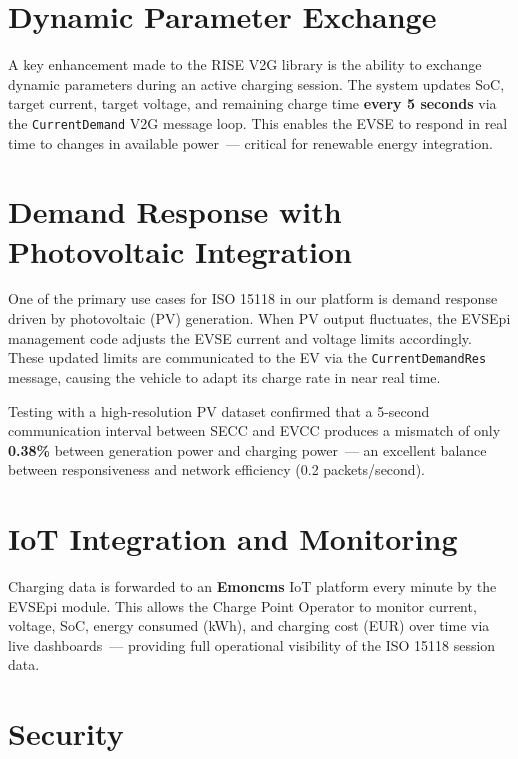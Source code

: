 \documentclass[12pt,a4paper]{report}
\begin{document}
\section{Dynamic Parameter Exchange}

A key enhancement made to the RISE V2G library is the ability to exchange dynamic parameters
during an active charging session. The system updates SoC, target current, target voltage, and
remaining charge time \textbf{every 5 seconds} via the \texttt{CurrentDemand} V2G message loop.
This enables the EVSE to respond in real time to changes in available power~--- critical for
renewable energy integration.

\section{Demand Response with Photovoltaic Integration}

One of the primary use cases for ISO 15118 in our platform is demand response driven by
photovoltaic (PV) generation. When PV output fluctuates, the EVSEpi management code adjusts
the EVSE current and voltage limits accordingly. These updated limits are communicated to the EV
via the \texttt{CurrentDemandRes} message, causing the vehicle to adapt its charge rate in near
real time.

Testing with a high-resolution PV dataset confirmed that a 5-second communication interval
between SECC and EVCC produces a mismatch of only \textbf{0.38\%} between generation power and
charging power~--- an excellent balance between responsiveness and network efficiency
(0.2 packets/second).

\section{IoT Integration and Monitoring}

Charging data is forwarded to an \textbf{Emoncms} IoT platform every minute by the EVSEpi
module. This allows the Charge Point Operator to monitor current, voltage, SoC, energy consumed
(kWh), and charging cost (EUR) over time via live dashboards~--- providing full operational
visibility of the ISO 15118 session data.

\section{Security}
\end{document}
